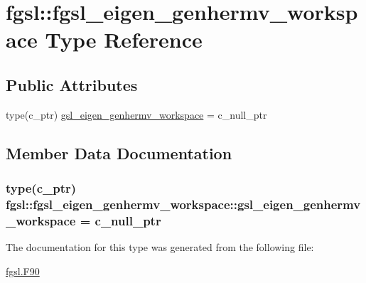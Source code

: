 \hypertarget{structfgsl_1_1fgsl__eigen__genhermv__workspace}{}\section{fgsl\+:\+:fgsl\+\_\+eigen\+\_\+genhermv\+\_\+workspace Type Reference}
\label{structfgsl_1_1fgsl__eigen__genhermv__workspace}
\subsection*{Public Attributes}
\begin{DoxyCompactItemize}
\item 
type(c\+\_\+ptr) \hyperlink{structfgsl_1_1fgsl__eigen__genhermv__workspace_a27c02e480d2679e5e01213ce48ceb989}{gsl\+\_\+eigen\+\_\+genhermv\+\_\+workspace} = c\+\_\+null\+\_\+ptr
\end{DoxyCompactItemize}


\subsection{Member Data Documentation}
\hypertarget{structfgsl_1_1fgsl__eigen__genhermv__workspace_a27c02e480d2679e5e01213ce48ceb989}{}
\subsubsection[{gsl\+\_\+eigen\+\_\+genhermv\+\_\+workspace}]{\setlength{\rightskip}{0pt plus 5cm}type(c\+\_\+ptr) fgsl\+::fgsl\+\_\+eigen\+\_\+genhermv\+\_\+workspace\+::gsl\+\_\+eigen\+\_\+genhermv\+\_\+workspace = c\+\_\+null\+\_\+ptr}\label{structfgsl_1_1fgsl__eigen__genhermv__workspace_a27c02e480d2679e5e01213ce48ceb989}


The documentation for this type was generated from the following file\+:\begin{DoxyCompactItemize}
\item 
\hyperlink{fgsl_8F90}{fgsl.\+F90}\end{DoxyCompactItemize}
